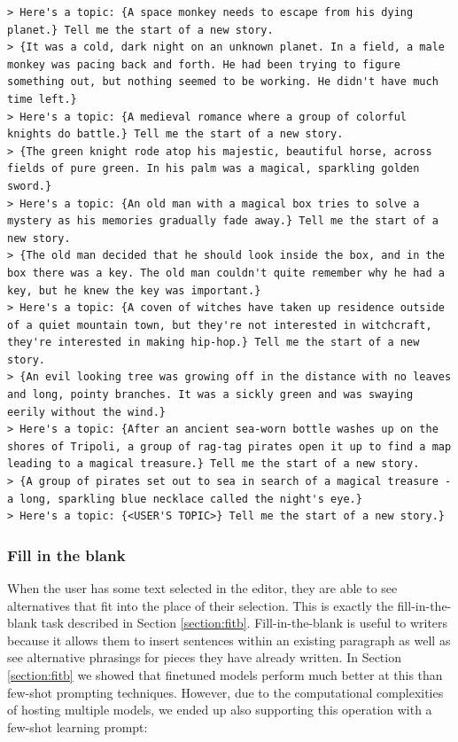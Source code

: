 \begin{lstlisting}
> Here's a topic: {A space monkey needs to escape from his dying planet.} Tell me the start of a new story.
> {It was a cold, dark night on an unknown planet. In a field, a male monkey was pacing back and forth. He had been trying to figure something out, but nothing seemed to be working. He didn't have much time left.}
> Here's a topic: {A medieval romance where a group of colorful knights do battle.} Tell me the start of a new story.
> {The green knight rode atop his majestic, beautiful horse, across fields of pure green. In his palm was a magical, sparkling golden sword.}
> Here's a topic: {An old man with a magical box tries to solve a mystery as his memories gradually fade away.} Tell me the start of a new story.
> {The old man decided that he should look inside the box, and in the box there was a key. The old man couldn't quite remember why he had a key, but he knew the key was important.}
> Here's a topic: {A coven of witches have taken up residence outside of a quiet mountain town, but they're not interested in witchcraft, they're interested in making hip-hop.} Tell me the start of a new story.
> {An evil looking tree was growing off in the distance with no leaves and long, pointy branches. It was a sickly green and was swaying eerily without the wind.}
> Here's a topic: {After an ancient sea-worn bottle washes up on the shores of Tripoli, a group of rag-tag pirates open it up to find a map leading to a magical treasure.} Tell me the start of a new story.
> {A group of pirates set out to sea in search of a magical treasure - a long, sparkling blue necklace called the night's eye.}
> Here's a topic: {<USER'S TOPIC>} Tell me the start of a new story.}
\end{lstlisting}

\subsubsection{Fill in the blank}
When the user has some text selected in the editor, they are able to see alternatives that fit into the place of their selection.
This is exactly the fill-in-the-blank task described in Section \ref{section:fitb}.
Fill-in-the-blank is useful to writers because it allows them to insert sentences within an existing paragraph as well as see alternative phrasings for pieces they have already written.
In Section \ref{section:fitb} we showed that finetuned models perform much better at this than few-shot prompting techniques.
However, due to the computational complexities of hosting multiple models, we ended up also supporting this operation with a few-shot learning prompt:

